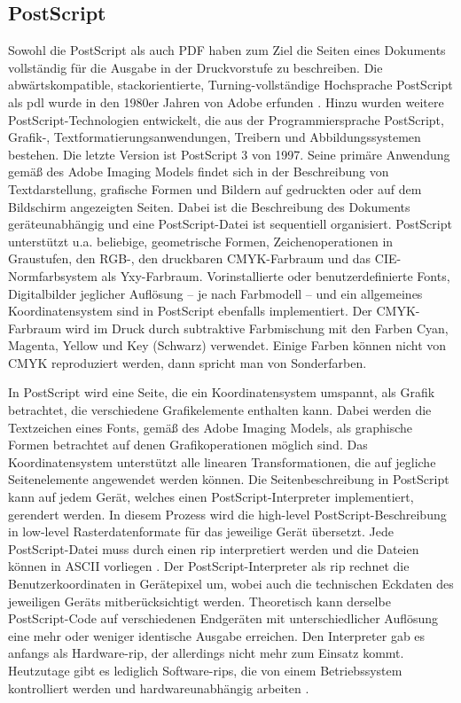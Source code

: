 \subsection{PostScript}
Sowohl die PostScript als auch PDF haben zum Ziel die Seiten eines Dokuments vollständig für die Ausgabe in der Druckvorstufe zu beschreiben. Die abwärtskompatible, stackorientierte, Turning-vollständige Hochsprache PostScript als \gls{pdl} wurde in den 1980er Jahren von Adobe erfunden \cite{adobe-postscript, wiki-postscript}. Hinzu wurden weitere PostScript-Technologien entwickelt, die aus der Programmiersprache PostScript, Grafik-, Textformatierungsanwendungen, Treibern und Abbildungssystemen bestehen. Die letzte Version ist PostScript 3 von 1997. Seine primäre Anwendung gemäß des Adobe Imaging Models findet sich in der Beschreibung von Textdarstellung, grafische Formen und Bildern auf gedruckten oder auf dem Bildschirm angezeigten Seiten. Dabei ist die Beschreibung des Dokuments geräteunabhängig und eine PostScript-Datei ist sequentiell organisiert. PostScript unterstützt u.a. beliebige, geometrische Formen, Zeichenoperationen in Graustufen, den RGB-, den druckbaren CMYK-Farbraum und das CIE-Normfarbsystem als Yxy-Farbraum. Vorinstallierte oder benutzerdefinierte Fonts, Digitalbilder jeglicher Auflösung – je nach Farbmodell – und ein allgemeines Koordinatensystem sind in PostScript ebenfalls implementiert. Der CMYK-Farbraum wird im Druck durch subtraktive Farbmischung mit den Farben Cyan, Magenta, Yellow und Key (Schwarz) verwendet. Einige Farben können nicht von CMYK reproduziert werden, dann spricht man von Sonderfarben.
\par
In PostScript wird eine Seite, die ein Koordinatensystem umspannt, als Grafik betrachtet, die verschiedene Grafikelemente enthalten kann. Dabei werden die Textzeichen eines Fonts, gemäß des Adobe Imaging Models, als graphische Formen betrachtet auf denen Grafikoperationen möglich sind. Das Koordinatensystem unterstützt alle linearen Transformationen, die auf jegliche Seitenelemente angewendet werden können. Die Seitenbeschreibung in PostScript kann auf jedem Gerät, welches einen PostScript-Interpreter implementiert, gerendert werden. In diesem Prozess wird die high-level PostScript-Beschreibung in low-level Rasterdatenformate für das jeweilige Gerät übersetzt. Jede PostScript-Datei muss durch einen \gls{rip} interpretiert werden und die Dateien können in ASCII vorliegen \cite{adobe-postscript}. Der PostScript-Interpreter als \gls{rip} rechnet die Benutzerkoordinaten in Gerätepixel um, wobei auch die technischen Eckdaten des jeweiligen Geräts mitberücksichtigt werden. Theoretisch kann derselbe PostScript-Code auf verschiedenen Endgeräten mit unterschiedlicher Auflösung eine mehr oder weniger identische Ausgabe erreichen. Den Interpreter gab es anfangs als Hardware-\gls{rip}, der allerdings nicht mehr zum Einsatz kommt. Heutzutage gibt es lediglich Software-\gls{rip}s, die von einem Betriebssystem kontrolliert werden und hardwareunabhängig arbeiten \cite{schneeberger}.


